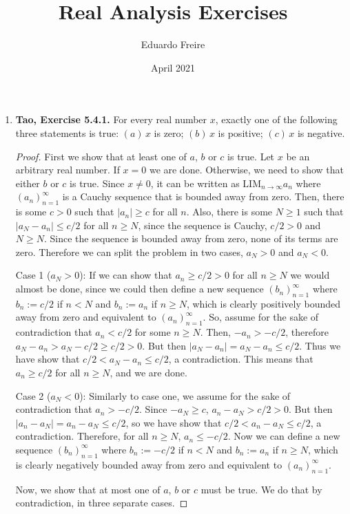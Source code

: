 \documentclass{article}
\title{Real Analysis Exercises}
\author{Eduardo Freire}
\date{April 2021}
\newcommand{\exc}[2][Abbott]{\item \textbf{#1, Exercise #2.}}
\begin{document}
\maketitle

\begin{enumerate}
	\exc[Tao]{5.4.1} For every real
	number $x$, exactly one of the following three statements is true: $(a)\, x$ is zero; $(b)\, x$ is positive; $(c)\, x$ is negative.
				      	      
	\begin{proof}
		First we show that at least one of $a$, $b$ or $c$ is true. Let $x$ be an arbitrary real number. If $x=0$ we are done. Otherwise, we need to show that either $b$ or $c$ is true. Since $x \neq 0$, it can be written as $\text{LIM}_{n \to \infty} a_n$ where $(a_n)_{n=1}^{\infty}$ is a Cauchy sequence that is bounded away from zero. Then, there is some $c > 0$ such that $|a_n| \geq c$ for all $n$. Also, there is some $N \geq 1$ such that $|a_N - a_n| \leq c/2$ for all $n \geq N$, since the sequence is Cauchy, $c/2 > 0$ and $N \geq N$. Since the sequence is bounded away from zero, none of its terms are zero. Therefore we can split the problem in two cases, $a_N > 0$ and $a_N < 0$.
							      		      	 
		Case 1 ($a_N > 0$): If we can show that $a_n \geq c/2 > 0$ for all $n \geq N$ we would almost be done, since we could then define a new sequence $(b_n)_{n=1}^\infty$ where $b_n := c/2$ if $n < N$ and $b_n := a_n$ if $n \geq N$, which is clearly positively bounded away from zero and equivalent to $(a_n)_{n=1}^{\infty}$. So, assume for the sake of contradiction that $a_n < c/2$ for some $n \geq N$. Then, $-a_n > -c/2$, therefore $a_N - a_n > a_N-c/2 \geq c/2 > 0$. But then $|a_N - a_n| = a_N - a_n \leq c/2$. Thus we have show that $c/2 < a_N-a_n \leq c/2$, a contradiction. This means that $a_n \geq c/2$ for all $n \geq N$, and we are done.
							      		      	 
		Case 2 ($a_N < 0$): Similarly to case one, we assume for the sake of contradiction that $a_n > -c/2$. Since $-a_N \geq c$, $a_n - a_N > c/2 > 0$. But then $|a_n - a_N| = a_n - a_N \leq c/2$, so we have show that $c/2 < a_n-a_N \leq c/2$, a contradiction. Therefore, for all $n \geq N$, $a_n \leq -c/2$. Now we can define a new sequence $(b_n)_{n=1}^\infty$ where $b_n := -c/2$ if $n < N$ and $b_n := a_n$ if $n \geq N$, which is clearly negatively bounded away from zero and equivalent to $(a_n)_{n=1}^{\infty}$.
							      		      	  
		Now, we show that at most one of $a$, $b$ or $c$ must be true. We do that by contradiction, in three separate cases.
							      		      	  

\end{proof}
\end{enumerate}
\end{document}

